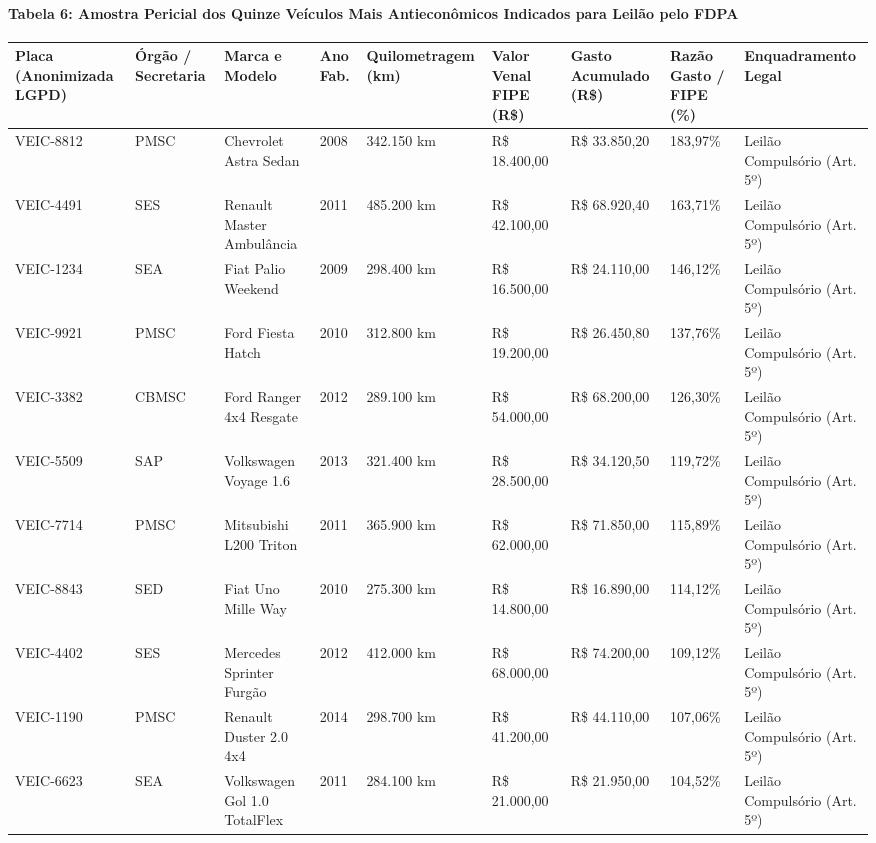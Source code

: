 \documentclass[10pt,a4paper,journal]{article}
\begin{document}
\paragraph{Tabela 6: Amostra Pericial dos Quinze Veículos Mais Antieconômicos Indicados para Leilão pelo FDPA}
\begin{table}[htbp]
\centering
\small
\begin{tabular}{lllllllll}
\toprule
Placa (Anonimizada LGPD) & Órgão / Secretaria & Marca e Modelo & Ano Fab. & Quilometragem (km) & Valor Venal FIPE (R\$) & Gasto Acumulado (R\$) & Razão Gasto / FIPE (\%) & Enquadramento Legal \\
\midrule
VEIC-8812 & PMSC & Chevrolet Astra Sedan & 2008 & 342.150 km & R\$ 18.400,00 & R\$ 33.850,20 & 183,97\% & Leilão Compulsório (Art. 5º) \\
VEIC-4491 & SES & Renault Master Ambulância & 2011 & 485.200 km & R\$ 42.100,00 & R\$ 68.920,40 & 163,71\% & Leilão Compulsório (Art. 5º) \\
VEIC-1234 & SEA & Fiat Palio Weekend & 2009 & 298.400 km & R\$ 16.500,00 & R\$ 24.110,00 & 146,12\% & Leilão Compulsório (Art. 5º) \\
VEIC-9921 & PMSC & Ford Fiesta Hatch & 2010 & 312.800 km & R\$ 19.200,00 & R\$ 26.450,80 & 137,76\% & Leilão Compulsório (Art. 5º) \\
VEIC-3382 & CBMSC & Ford Ranger 4x4 Resgate & 2012 & 289.100 km & R\$ 54.000,00 & R\$ 68.200,00 & 126,30\% & Leilão Compulsório (Art. 5º) \\
VEIC-5509 & SAP & Volkswagen Voyage 1.6 & 2013 & 321.400 km & R\$ 28.500,00 & R\$ 34.120,50 & 119,72\% & Leilão Compulsório (Art. 5º) \\
VEIC-7714 & PMSC & Mitsubishi L200 Triton & 2011 & 365.900 km & R\$ 62.000,00 & R\$ 71.850,00 & 115,89\% & Leilão Compulsório (Art. 5º) \\
VEIC-8843 & SED & Fiat Uno Mille Way & 2010 & 275.300 km & R\$ 14.800,00 & R\$ 16.890,00 & 114,12\% & Leilão Compulsório (Art. 5º) \\
VEIC-4402 & SES & Mercedes Sprinter Furgão & 2012 & 412.000 km & R\$ 68.000,00 & R\$ 74.200,00 & 109,12\% & Leilão Compulsório (Art. 5º) \\
VEIC-1190 & PMSC & Renault Duster 2.0 4x4 & 2014 & 298.700 km & R\$ 41.200,00 & R\$ 44.110,00 & 107,06\% & Leilão Compulsório (Art. 5º) \\
VEIC-6623 & SEA & Volkswagen Gol 1.0 TotalFlex & 2011 & 284.100 km & R\$ 21.000,00 & R\$ 21.950,00 & 104,52\% & Leilão Compulsório (Art. 5º) \\

\end{tabular}
\end{table}
\end{document}
